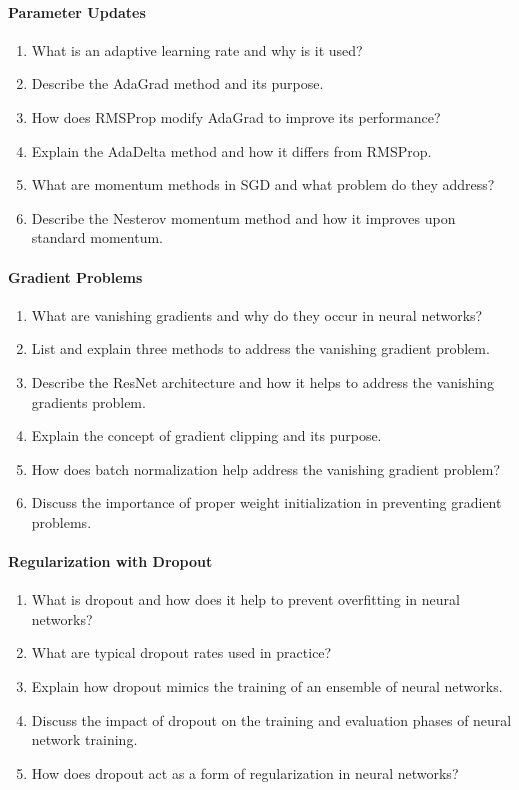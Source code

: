 \paragraph*{Parameter Updates}
\begin{enumerate}
    \item What is an adaptive learning rate and why is it used?
    \item Describe the AdaGrad method and its purpose.
    \item How does RMSProp modify AdaGrad to improve its performance?
    \item Explain the AdaDelta method and how it differs from RMSProp.
    \item What are momentum methods in SGD and what problem do they address?
    \item Describe the Nesterov momentum method and how it improves upon standard momentum.
\end{enumerate}
\paragraph*{Gradient Problems}
\begin{enumerate}
    \item What are vanishing gradients and why do they occur in neural networks?
    \item List and explain three methods to address the vanishing gradient problem.
    \item Describe the ResNet architecture and how it helps to address the vanishing gradients problem.
    \item Explain the concept of gradient clipping and its purpose.
    \item How does batch normalization help address the vanishing gradient problem?
    \item Discuss the importance of proper weight initialization in preventing gradient problems.
\end{enumerate}
\paragraph*{Regularization with Dropout}
\begin{enumerate}
    \item What is dropout and how does it help to prevent overfitting in neural networks?
    \item What are typical dropout rates used in practice?
    \item Explain how dropout mimics the training of an ensemble of neural networks.
    \item Discuss the impact of dropout on the training and evaluation phases of neural network training.
    \item How does dropout act as a form of regularization in neural networks?
\end{enumerate}
